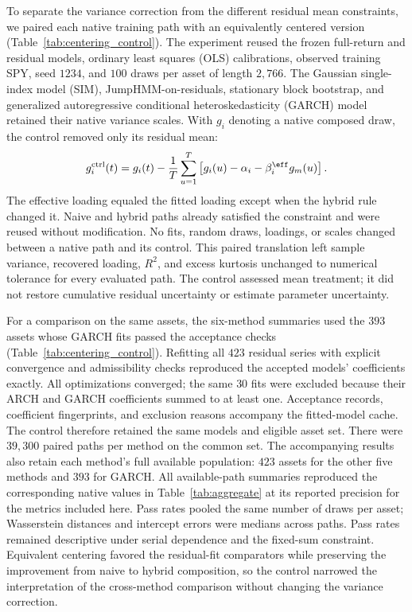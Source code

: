 To separate the variance correction from the different residual mean
constraints, we paired each native training path with an equivalently
centered version (Table~\ref{tab:centering_control}). The experiment
reused the frozen full-return and residual models, ordinary least
squares (OLS) calibrations, observed training SPY, seed $1234$, and
$100$ draws per asset of length $2{,}766$. The Gaussian single-index
model (SIM), JumpHMM-on-residuals, stationary block bootstrap, and
generalized autoregressive conditional heteroskedasticity (GARCH)
model retained their native variance scales. With $g_i$ denoting a
native composed draw, the control removed only its residual mean:
\begin{equation}
  g_i^{\mathrm{ctrl}}(t)
  = g_i(t)-\frac{1}{T}\sum_{u=1}^{T}
    \left[g_i(u)-\alpha_i-\beta_i^{\eff}g_m(u)\right].
  \label{eq:supp-centering-control}
\end{equation}
The effective loading equaled the fitted loading except when the
hybrid rule changed it. Naive and hybrid paths already satisfied the
constraint and were reused without modification. No fits, random
draws, loadings, or scales changed between a native path and its
control. This paired translation left sample variance, recovered
loading, $R^2$, and excess kurtosis unchanged to numerical tolerance
for every evaluated path. The control assessed mean treatment; it did
not restore cumulative residual uncertainty or estimate parameter
uncertainty.

For a comparison on the same assets, the six-method summaries used
the $393$ assets whose GARCH fits passed the acceptance checks
(Table~\ref{tab:centering_control}). Refitting all $423$ residual
series with explicit convergence and admissibility checks reproduced
the accepted models' coefficients exactly. All optimizations converged;
the same $30$ fits were excluded because their ARCH and GARCH
coefficients summed to at least one. Acceptance records, coefficient
fingerprints, and exclusion reasons accompany the fitted-model cache.
The control therefore retained the same models and eligible asset set. There were $39{,}300$
paired paths per method on the common set. The accompanying results
also retain each method's full available population: $423$ assets
for the other five methods and $393$ for GARCH. All available-path
summaries reproduced the corresponding native values in
Table~\ref{tab:aggregate} at its reported precision for the metrics
included here. Pass rates pooled the same number of draws per asset;
Wasserstein distances and intercept errors were medians across paths.
Pass rates remained descriptive under serial dependence and the
fixed-sum constraint. Equivalent centering favored the residual-fit
comparators while preserving the improvement from naive to hybrid
composition, so the control narrowed the interpretation of the
cross-method comparison without changing the variance correction.

